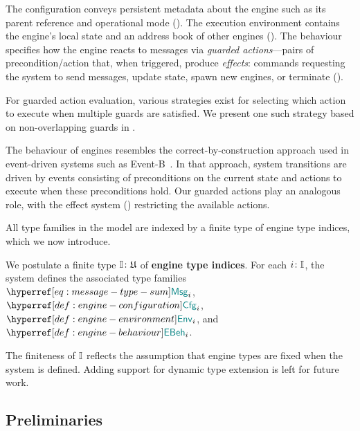 \documentclass[
  a4paper,        %
  techreport,     %
]{art}
\begin{document}
The configuration conveys persistent metadata about the engine such as its
parent reference and operational mode (). The
execution environment contains the engine's local state and an address book of
other engines (). The behaviour specifies how the
engine reacts to messages via \emph{guarded actions}---pairs of
precondition/action that, when triggered, produce \emph{effects}: commands
requesting the system to send messages, update state, spawn new engines, or
terminate ().

For guarded action evaluation, various strategies exist for selecting which
action to execute when multiple guards are satisfied. We present one such
strategy based on non-overlapping guards in .

\begin{remark}\label{rem:event-driven-systems}%
  The behaviour of engines resembles the correct-by-construction approach used
  in event-driven systems such as Event-B~\cite{dupont:tel-04165215}. In that
  approach, system transitions are driven by events consisting of preconditions
  on the current state and actions to execute when these preconditions hold.
  Our guarded actions play an analogous role, with the effect system
  () restricting the available actions.
\end{remark}

All type families in the model are indexed by a finite type of engine type
indices, which we now introduce.

\begin{definition}\label{def:engine-type-index}%
We postulate a finite type $\mathbb{I}\colon\mathfrak{U}$ of \textbf{engine type
indices}. For each $i\colon\mathbb{I}$, the system defines the associated
type families $\msgtype{i}$, $\configtype{i}$, $\envtype{i}$, and
$\behaviourtype{i}$.
\end{definition}

The finiteness of $\mathbb{I}$ reflects the assumption that engine types are fixed
when the system is defined. Adding support for dynamic type extension is left
for future work.

\subsection{Preliminaries}\label{sec:preliminaries}%
\end{document}
